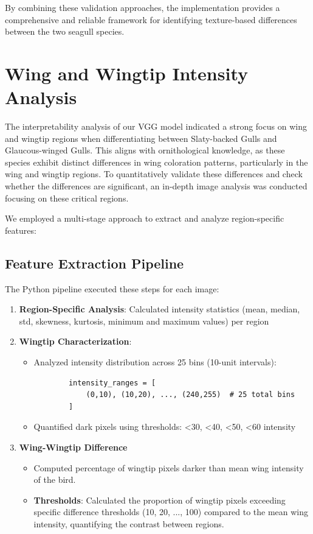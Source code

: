 \documentclass[a4paper,12pt]{report}
\begin{document}
By combining these validation approaches, the implementation provides a comprehensive and reliable framework for identifying texture-based differences between the two seagull species.

\section{Wing and Wingtip Intensity Analysis}
The interpretability analysis of our VGG model indicated a strong focus on wing and wingtip regions when differentiating between Slaty-backed Gulls and Glaucous-winged Gulls. This aligns with ornithological knowledge, as these species exhibit distinct differences in wing coloration patterns, particularly in the wing and wingtip regions. To quantitatively validate these differences and check whether the differences are significant, an in-depth image analysis was conducted focusing on these critical regions.


We employed a multi-stage approach to extract and analyze region-specific features:

\subsection{Feature Extraction Pipeline}
The Python pipeline executed these steps for each image:
\begin{enumerate}
    \item \textbf{Region-Specific Analysis}: Calculated intensity statistics (mean, median, std, skewness, kurtosis, minimum and maximum values) per region
 
    \item \textbf{Wingtip Characterization}:
    \begin{itemize}
        \item Analyzed intensity distribution across 25 bins (10-unit intervals):
        \begin{verbatim}
        intensity_ranges = [
            (0,10), (10,20), ..., (240,255)  # 25 total bins
        ]
        \end{verbatim}
        \item Quantified dark pixels using thresholds: <30, <40, <50, <60 intensity
    \end{itemize}
    \item \textbf{Wing-Wingtip Difference}
    \begin{itemize}
        \item Computed percentage of wingtip pixels darker than mean wing intensity of the bird.
        \item \textbf{Thresholds}: Calculated the proportion of wingtip pixels exceeding specific difference thresholds (10, 20, ..., 100) compared to the mean wing intensity, quantifying the contrast between regions.
    \end{itemize}
\end{enumerate}
\end{document}
